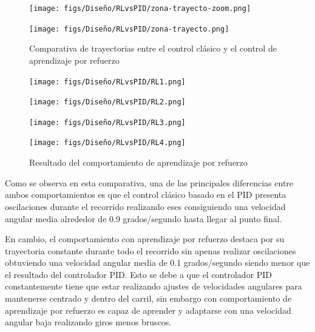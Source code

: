 \begin{figure}[H]
  \centering
  \begin{minipage}{0.55\textwidth}
    \texttt{[image: figs/Diseño/RLvsPID/zona-trayecto-zoom.png]}
  \end{minipage}
  \begin{minipage}{0.55\textwidth}
    \texttt{[image: figs/Diseño/RLvsPID/zona-trayecto.png]}
  \end{minipage}
  \caption{Comparativa de trayectorias entre el control clásico y el control de aprendizaje por refuerzo}
  \label{fig:Comparativa-de-trayectorias}
\end{figure}

\begin{figure}[H]
  \centering
  \begin{minipage}{0.3\textwidth}
    \texttt{[image: figs/Diseño/RLvsPID/RL1.png]}
  \end{minipage}
  \hfill
  \begin{minipage}{0.3\textwidth}
    \texttt{[image: figs/Diseño/RLvsPID/RL2.png]}
  \end{minipage}
  \hfill
  \begin{minipage}{0.3\textwidth}
    \texttt{[image: figs/Diseño/RLvsPID/RL3.png]}
  \end{minipage}
  \hfill
  \begin{minipage}{0.3\textwidth}
    \texttt{[image: figs/Diseño/RLvsPID/RL4.png]}
  \end{minipage}
  \caption{Resultado del comportamiento de aprendizaje por refuerzo}
  \label{fig:inferencia-imagenes}
\end{figure}
\newpage
Como se observa en esta comparativa, una de las principales diferencias entre ambos comportamientos es que el control clásico basado en el PID presenta oscilaciones durante el recorrido 
realizando eses consiguiendo una velocidad angular media alrededor de 0.9 grados/segundo hasta llegar al punto final.  

En cambio, el comportamiento con aprendizaje por refuerzo destaca por su trayectoria constante durante todo el recorrido sin apenas realizar oscilaciones obtuviendo una velocidad angular 
media de 0.1 grados/segundo siendo menor que el resultado del controlador PID. Esto se debe a que el controlador PID constantemente tiene que estar realizando ajustes de velocidades 
angulares para mantenerse centrado y dentro del carril, sin embargo con comportamiento de aprendizaje por refuerzo es capaz de aprender y adaptarse con una velocidad angular baja 
realizando giros menos bruscos. 

